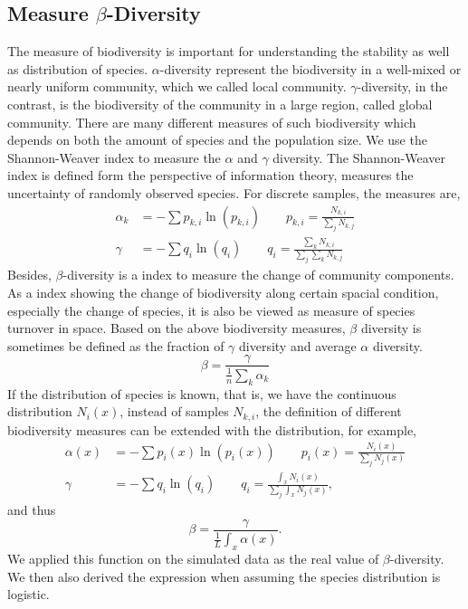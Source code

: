 \subsection{Measure $\beta$-Diversity} The measure of biodiversity is important for understanding the stability as well as distribution of species. $\alpha$-diversity represent the biodiversity in a well-mixed or nearly uniform community, which we called local community. $\gamma$-diversity, in the contrast, is the biodiversity of the community in a large region, called global community. There are many different measures of such biodiversity which depends on both the amount of species and the population size. We use the Shannon-Weaver index to measure the $\alpha$ and $\gamma$ diversity. The Shannon-Weaver index is defined form the perspective of information theory, measures the uncertainty of randomly observed species. For discrete samples, the measures are, \begin{align*}\label{eqn:alpha_gamma_dis} \alpha_k &= -\sum p_{k,i} \ln(p_{k,i}) \qquad p_{k,i} = \frac{N_{k,i}}{\sum_{j}N_{k,j}}\\ \gamma &= -\sum q_i \ln(q_i) \qquad q_i = \frac{\sum_{k}N_{k,i}}{\sum_{j}\sum_{k}N_{k,j}} \end{align*} Besides, $\beta$-diversity is a index to measure the change of community components. As a index showing the change of biodiversity along certain spacial condition, especially the change of species, it is also be viewed as measure of species turnover in space. Based on the above biodiversity measures, $\beta$ diversity is sometimes be defined as the fraction of $\gamma$ diversity and average $\alpha$ diversity. \begin{equation*}\label{eqn:beta_dis} \beta = \frac{\gamma}{\frac{1}{n} \sum_{k} \alpha_k} \end{equation*} If the distribution of species is known, that is, we have the continuous distribution $N_i(x)$, instead of samples $N_{k,i}$, the definition of different biodiversity measures can be extended with the distribution, for example, \begin{align*}\label{eqn:alpha_gamma_con} \alpha(x) &= -\sum p_{i}(x) \ln(p_{i}(x)) \qquad p_{i}(x) = \frac{N_{i}(x)}{\sum_{j}N_{j}(x)}\\ \gamma &= -\sum q_i \ln(q_i) \qquad q_i = \frac{\int_{x} N_{i}(x)}{\sum_{j} \int_{x} N_{j}(x)}, \end{align*} and thus \begin{equation*}\label{eqn:beta_con} \beta = \frac{\gamma}{\frac{1}{L} \int_{x} \alpha(x)}. \end{equation*} We applied this function on the simulated data as the real value of $\beta$-diversity. We then also derived the expression when assuming the species distribution is logistic.